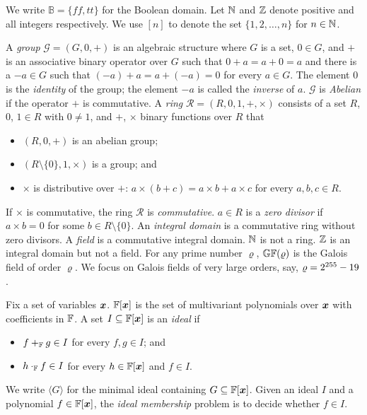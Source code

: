 
We write $\mathbb{B} = \{ \mathit{ff}, \mathit{tt} \}$ for the Boolean
domain. Let $\mathbb{N}$ and $\mathbb{Z}$ denote positive and all integers
respectively. We use $[n]$ to denote the set $\{ 1, 2, \ldots, n \}$
for $n \in \mathbb{N}$. 

A \emph{group} $\mathcal{G} = (G, 0, +)$ is an algebraic structure
where $G$ is a set, $0 \in G$, and $+$ is an associative binary
operator over $G$ such that $0 + a = a + 0 = a$ and there is a $-a \in
G$ such that $(-a) + a = a + (-a) = 0$ for every $a \in G$. The
element $0$ is the \emph{identity} of the group; the element $-a$ is
called the \emph{inverse} of $a$. $\mathcal{G}$ is \emph{Abelian} if
the operator $+$ is commutative.
A \emph{ring} $\mathcal{R} = (R, 0, 1, +, \times)$ consists of a set
$R$, $0$, $1 \in R$ with $0 \neq 1$, and $+$, $\times$ binary
functions over $R$ that
\begin{itemize}
\item $(R, 0, +)$ is an abelian group; 
\item $(R \setminus \{ 0 \}, 1, \times)$ is a group; and 
\item $\times$ is distributive over $+$: $a \times (b + c) = a \times
  b + a \times c$ for every $a, b, c \in R$.
\end{itemize}
If $\times$ is commutative, the ring $\mathcal{R}$ is
\emph{commutative}. $a \in R$ is a \emph{zero divisor} if 
$a \times b = 0$ for some $b \in R \setminus \{ 0 \}$. An
\emph{integral domain} is a commutative ring without zero divisors. 
A \emph{field} is a commutative integral domain. $\mathbb{N}$ is not a ring.
$\mathbb{Z}$ is an integral domain but not a field.
For any prime number $\varrho$, $\mathbb{GF}(\varrho)$
is the Galois field of order $\varrho$. We focus on Galois fields of
very large orders, say, $\varrho = 2^{255} - 19$. 

Fix a set of variables $\vx$. $\bbfF[\vx]$ is the set of multivariant
polynomials over $\vx$ with coefficients in $\mathbb{F}$. A set 
$I \subseteq \bbfF[\vx]$ is an \emph{ideal} if
\begin{itemize}
\item $f +_{\mathbb{F}} g \in I$ for every $f, g \in I$; and
\item $h \cdot_{\mathbb{F}} f \in I$ for every $h \in \bbfF[\vx]$ and $f \in I$.
\end{itemize}
We write $\langle G \rangle$ for the minimal ideal containing $G
\subseteq \bbfF[\vx]$. Given an ideal $I$ and a polynomial $f \in
\bbfF[\vx]$, the \emph{ideal membership} problem is to decide whether
$f \in I$.
